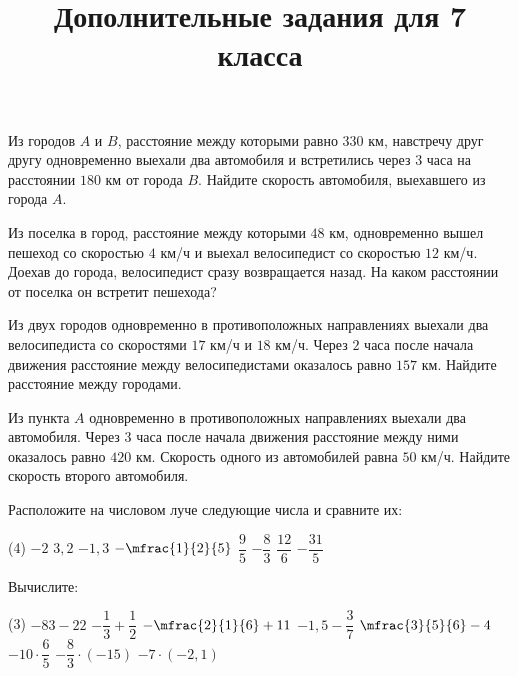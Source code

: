 \begin{class}[number=4]
\begin{listofex}
		\item Из городов \( A \) и \( B \), расстояние между которыми равно \( 330 \) км, навстречу друг другу одновременно выехали два автомобиля и встретились через \( 3 \) часа на расстоянии \( 180 \) км от города \( B \). Найдите скорость автомобиля, выехавшего из города \( A \).
		\item Из поселка в город, расстояние между которыми \( 48 \) км, одновременно вышел пешеход со скоростью \( 4 \) км/ч и выехал велосипедист со скоростью \( 12 \) км/ч. Доехав до города, велосипедист сразу возвращается назад. На каком расстоянии от поселка он встретит пешехода?
		\item Из двух городов одновременно в противоположных направлениях выехали два
		велосипедиста со скоростями \( 17 \) км/ч и \( 18 \) км/ч. Через \( 2 \) часа после начала движения расстояние между велосипедистами оказалось равно \( 157 \) км. Найдите расстояние между городами.
		\item Из пункта \( A \) одновременно в противоположных направлениях выехали два автомобиля.	Через \( 3 \) часа после начала движения расстояние между ними оказалось равно \( 420 \) км. Скорость одного из автомобилей равна \( 50 \) км/ч. Найдите скорость второго автомобиля.
	\end{listofex}
		\title{Дополнительные задания для 7 класса}
		\begin{listofex}
		\item Расположите на числовом луче следующие числа и сравните их:
		\begin{tasks}(4)
			\task \( -2 \)
			\task \( 3,2 \)
			\task \( -1,3 \)
			\task \( -\mfrac{1}{2}{5} \)
			\task \( \dfrac{9}{5} \)
			\task \( -\dfrac{8}{3} \)
			\task \( \dfrac{12}{6} \)
			\task \( -\dfrac{31}{5} \)
		\end{tasks}
		\item Вычислите:
		\begin{tasks}(3)
			\task \( -83-22 \)
			\task \( -\dfrac{1}{3}+\dfrac{1}{2} \)
			\task \( -\mfrac{2}{1}{6}+11 \)
			\task \( -1,5-\dfrac{3}{7} \)
			\task \( \mfrac{3}{5}{6}-4 \)
			\task \( -10 \cdot \dfrac{6}{5} \)
			\task \( -\dfrac{8}{3} \cdot (-15) \)
			\task \( -7 \cdot (-2,1) \)
		\end{tasks}
		\end{listofex}
\end{class}
